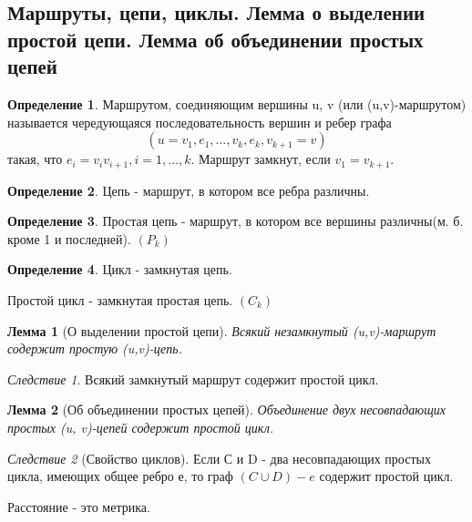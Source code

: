 \documentclass[a4paper]{article}
\newtheorem{lemma}{Лемма}[section]
\theoremstyle{definition}
\newtheorem*{definition}{Определение}
\theoremstyle{remark}
\newtheorem*{corollary}{Следствие}
\begin{document}
\begin{multicols*}{2}
    \section{Маршруты, цепи, циклы. Лемма о выделении простой цепи. Лемма об объединении 
    простых цепей}
    \begin{definition}
        Маршрутом, соединяющим вершины u, v (или (u,v)-маршрутом) называется чередующаяся последовательность вершин и ребер графа $$(u = v_1, e_1, \dots, v_k, e_k, v_{k+1} = v)$$ такая, что $e_i = v_i v_{i+1}, i = 1, \dots, k$. Маршрут замкнут, если $v_1 = v_{k+1}$.
    \end{definition}
    \begin{definition}
        Цепь - маршрут, в котором все ребра различны.
    \end{definition}
    \begin{definition}
        Простая цепь - маршрут, в котором все вершины различны(м. б. кроме 1 и последней).  $(P_k)$
    \end{definition}
    \begin{definition}
        Цикл - замкнутая цепь.
    \end{definition}
        Простой цикл - замкнутая простая цепь.  $(C_k)$
    \begin{lemma}[О выделении простой цепи]
        Всякий незамкнутый (u,v)-маршрут содержит простую (u,v)-цепь.
    \end{lemma}
    \begin{corollary}
        Всякий замкнутый маршрут содержит простой цикл.
    \end{corollary}
    \begin{lemma}[Об объединении простых цепей]
        Объединение двух несовпадающих простых (u, v)-цепей содержит простой цикл.
    \end{lemma}
    \begin{corollary}[Свойство циклов]
        Если С и D - два несовпадающих простых цикла, имеющих общее ребро е, то граф $(C\cup D) - e$ содержит простой цикл. 
    \end{corollary}
    Расстояние - это метрика.

\end{multicols*}
\end{document}
